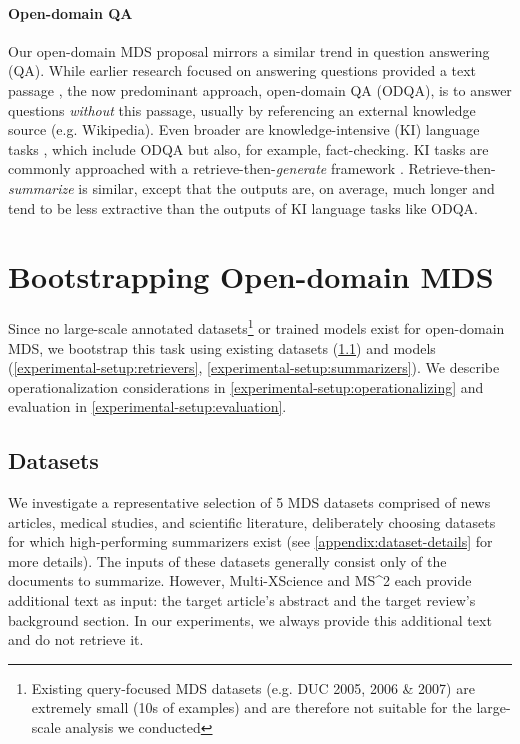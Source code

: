 \documentclass[11pt]{article}
\newcommand\mstoo{{MS\^{}2}\xspace}
\begin{document}
\paragraph{Open-domain QA} Our open-domain MDS proposal mirrors a similar trend in question answering (QA). While earlier research focused on answering questions provided a text passage \citep{rajpurkar-etal-2016-squad, rajpurkar-etal-2018-know}, the now predominant approach, open-domain QA (ODQA), is to answer questions \textit{without} this passage, usually by referencing an external knowledge source (e.g. Wikipedia). Even broader are knowledge-intensive (KI) language tasks \citep{petroni-etal-2021-kilt}, which include ODQA but also, for example, fact-checking. KI tasks are commonly approached with a retrieve-then-\textit{generate} framework \citep{REALM, RAG, RETRO}. Retrieve-then-\textit{summarize} is similar, except that the outputs are, on average, much longer and tend to be less extractive than the outputs of KI language tasks like ODQA.

\vspace{-1.0mm}
\section{Bootstrapping Open-domain MDS}
\label{bootstraping}
\vspace{-1.0mm}

Since no large-scale annotated datasets\footnote{Existing query-focused MDS datasets (e.g. DUC 2005, 2006 \& 2007) are extremely small (10s of examples) and are therefore not suitable for the large-scale analysis we conducted} or trained models exist for open-domain MDS, we bootstrap this task using existing datasets (\textsection \ref{experimental-setup:datasets}) and models (\textsection \ref{experimental-setup:retrievers}, \textsection \ref{experimental-setup:summarizers}). We describe operationalization considerations in \textsection \ref{experimental-setup:operationalizing} and evaluation in \textsection \ref{experimental-setup:evaluation}.

\subsection{Datasets} \label{experimental-setup:datasets}

We investigate a representative selection of 5 MDS datasets comprised of news articles, medical studies, and scientific literature, deliberately choosing datasets for which high-performing summarizers exist (see \autoref{appendix:dataset-details} for more details). The inputs of these datasets generally consist only of the documents to summarize. However, Multi-XScience and \mstoo each provide additional text as input: the target article's abstract and the target review's background section. In our experiments, we always provide this additional text and do not retrieve it.
\end{document}
